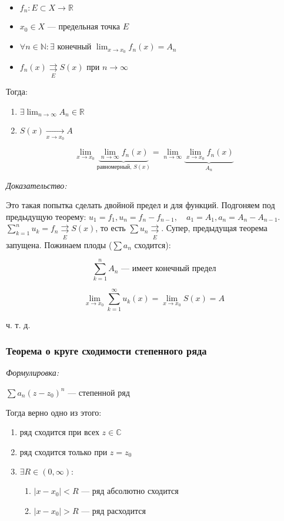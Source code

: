\documentclass{article}
\def\rsh#1{\underset{#1}{\rightrightarrows}}
\def\rshe{\rsh{E}}
\begin{document}
\begin{itemize}
    \item $f_n: E \subset X \rightarrow \mathbb{R}$
    \item $x_0 \in X$ --- предельная точка $E$
    \item $\forall n \in \mathbb{N}: \exists$ конечный $\lim_{x \rightarrow x_0} f_n(x) = A_n$
    \item $f_n(x) \rshe S(x)$ при $n \rightarrow \infty$
\end{itemize}

Тогда: 

\begin{enumerate}
    \item $\exists \lim_{n \rightarrow \infty} A_n \in \mathbb{R}$
    \item $S(x) \underset{x \rightarrow x_0}{\longrightarrow} A$
\end{enumerate}

\[\lim_{x \rightarrow x_0} \underbrace{\lim_{n \rightarrow \infty}f_n(x)}_{\text{равномерный, } S(x)} =  \lim_{n \rightarrow \infty} \underbrace{\lim_{x \rightarrow x_0} f_n(x)}_{A_n}\]

\textit{Доказательство:}

Это такая попытка сделать двойной предел и для функций. Подгоняем под предыдущую теорему: $u_1 = f_1, u_n = f_n - f_{n - 1}, \quad a_1 = A_1, a_n = A_n - A_{n - 1}$. $\sum_{k = 1}^n u_k = f_n \rshe S(x)$, то есть $\sum u_n \rshe$. Супер, предыдущая теорема запущена. Пожинаем плоды ($\sum a_n$ сходится):

\[\sum_{k = 1}^n A_n \text{ --- имеет конечный предел}\]

\[\lim_{x \rightarrow x_0} \sum_{k = 1}^{\infty} u_k(x) = \lim_{x \rightarrow x_0} S(x) = A\]

ч. т. д.

\subsubsection{Теорема о круге сходимости степенного ряда}
\textit{Формулировка:}

$\sum a_n (z - z_0)^n$ --- степенной ряд

Тогда верно одно из этого:

\begin{enumerate}
    \item ряд сходится при всех $z \in \mathbb{C}$
    \item ряд сходится только при $z = z_0$
    \item $\exists R \in (0, \infty):$ \begin{enumerate}
        \item $|x - x_0| < R$ --- ряд абсолютно сходится
        \item $|x - x_0| > R$ --- ряд расходится
    \end{enumerate}
\end{enumerate}
\end{document}
